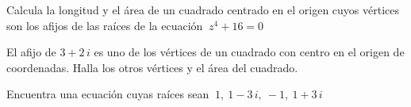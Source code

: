 \vspace{-8mm}
\begin{flushright}
\begin{footnotesize} \textcolor{gris}{}	\end{footnotesize}
\end{flushright}


\begin{mipropuesto}

Calcula la longitud y el área de un cuadrado centrado en el origen cuyos vértices son los afijos de las raíces de la ecuación $\ z^4+16=0$

\end{mipropuesto}

\vspace{-8mm}
\begin{flushright}
\begin{footnotesize} \textcolor{gris}{}	\end{footnotesize}
\end{flushright}


\begin{mipropuesto}

El afijo de $3 + 2\, i$ es uno de los vértices de un cuadrado con centro en el origen de coordenadas. Halla los otros vértices y el área del cuadrado.
\end{mipropuesto}

\vspace{-8mm}
\begin{flushright}
\begin{footnotesize} \textcolor{gris}{}	\end{footnotesize}
\end{flushright}



\begin{mipropuesto}

Encuentra una ecuación cuyas raíces sean $\ 1, \ 1-3\, i,\ -1,\ 1+3\, i$
\end{mipropuesto}

\vspace{-8mm}
\begin{flushright}
\begin{footnotesize} \textcolor{gris}{}	\end{footnotesize}
\end{flushright}


